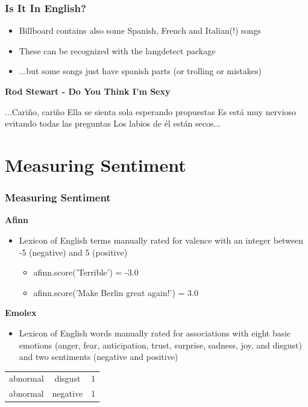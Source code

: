 \documentclass[10pt]{beamer}
\begin{document}
\begin{frame}
\frametitle{Is It In English?}

\medskip

\begin{itemize}
    \item Billboard contains also some Spanish, French and Italian(!) songs
    \pause
    \item These can be recognized with the langdetect package
    \pause
    \item ...but some songs just have spanish parts (or trolling or mistakes)
\end{itemize}

\bigskip

\textbf{Rod Stewart - Do You Think I'm Sexy}

...Cariño, cariño  Ella se sienta sola esperando propuestas Es está muy nervioso evitando todas las preguntas Los labios de él están secos...

\end{frame}

\section{Measuring Sentiment}

\begin{frame}
\frametitle{Measuring Sentiment}

\textbf{Afinn}

\begin{itemize}
    \item Lexicon of English terms manually rated for valence with an integer between -5 (negative) and 5 (positive)
    \begin{itemize}
        \item afinn.score('Terrible') = -3.0
        \item afinn.score('Make Berlin great again!') = 3.0
    \end{itemize}
\end{itemize}

\pause

\textbf{Emolex}

\begin{itemize}
    \item Lexicon of English words manually rated for associations with eight basic emotions (anger, fear, anticipation, trust, surprise, sadness, joy, and disgust) and two sentiments (negative and positive)
\end{itemize}

\medskip

\begin{tabular}{ l c r }
    abnormal & disgust & 1 \\
    abnormal & negative & 1 \\
\end{tabular}

\end{frame}
\end{document}
